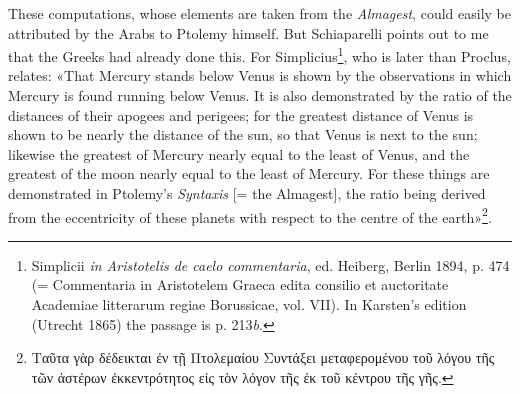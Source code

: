 \documentclass[11pt]{article}
\begin{document}
\par These computations, whose elements are taken from the \emph{Almagest}, could easily be attributed by the Arabs to Ptolemy himself. But Schiaparelli points out to me that the Greeks had already done this. For Simplicius\footnote{Simplicii \emph{in Aristotelis de caelo commentaria}, ed. Heiberg, Berlin 1894, p. 474 (= Commentaria in Aristotelem Graeca edita consilio et auctoritate Academiae litterarum regiae Borussicae, vol. VII). In Karsten's edition (Utrecht 1865) the passage is p. 213\emph{b}.}, who is later than Proclus, relates: «That Mercury stands below Venus is shown by the observations in which Mercury is found running below Venus. It is also demonstrated by the ratio of the distances of their apogees and perigees; for the greatest distance of Venus is shown to be nearly the distance of the sun, so that Venus is next to the sun; likewise the greatest of Mercury nearly equal to the least of Venus, and the greatest of the moon nearly equal to the least of Mercury. For these things are demonstrated in Ptolemy's \emph{Syntaxis} [= the Almagest], the ratio being derived from the eccentricity of these planets with respect to the centre of the earth»\footnote{{\greekfont Ταῦτα γὰρ δέδεικται ἐν τῇ Πτολεμαίου Συντάξει μεταφερομένου τοῦ λόγου τῆς τῶν ἀστέρων ἐκκεντρότητος εἰς τὸν λόγον τῆς ἐκ τοῦ κέντρου τῆς γῆς}.}.\par
\end{document}

